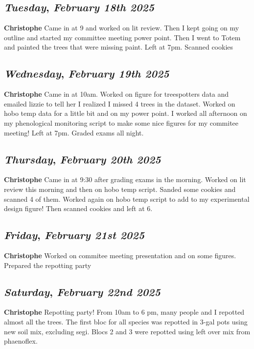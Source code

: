 \def\day{\textit{February 18th 2025}}
\def\weekday{\textit{Tuesday}}
\subsection*{\weekday, \day}
\textbf {Christophe}
Came in at 9 and worked on lit review. Then I kept going on my outline and started my committee meeting power point. Then I went to Totem and painted the trees that were missing paint. Left at 7pm. Scanned cookies

\def\day{\textit{February 19th 2025}}
\def\weekday{\textit{Wednesday}}
\subsection*{\weekday, \day}
\textbf {Christophe}
Came in at 10am. Worked on figure for treespotters data and emailed lizzie to tell her I realized I missed 4 trees in the dataset. Worked on hobo temp data for a little  bit and on my power point. I worked all afternoon on my phenological monitoring script to make some nice figures for my commitee meeting! Left at 7pm. Graded exams all night.

\def\day{\textit{February 20th 2025}}
\def\weekday{\textit{Thursday}}
\subsection*{\weekday, \day}
\textbf {Christophe}
Came in at 9:30 after grading exams in the morning. Worked on lit review this morning and then on hobo temp script. Sanded some cookies and scanned 4 of them. Worked again on hobo temp script to add to my experimental design figure! Then scanned cookies and left at 6. 

\def\day{\textit{February 21st 2025}}
\def\weekday{\textit{Friday}}
\subsection*{\weekday, \day}
\textbf {Christophe}
Worked on commitee meeting presentation and on some figures. Prepared the repotting party

\def\day{\textit{February 22nd 2025}}
\def\weekday{\textit{Saturday}}
\subsection*{\weekday, \day}
\textbf {Christophe}
Repotting party! From 10am to 6 pm, many people and I repotted almost all the trees. The first bloc for all species was repotted in 3-gal pots using new soil mix, excluding segi. Blocs 2 and 3 were repotted using left over mix from phaenoflex. 

